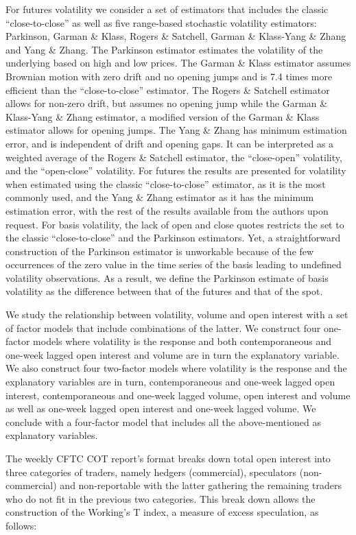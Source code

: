 \documentclass[12pt,]{article}
\begin{document}
For futures volatility we consider a set of estimators that includes the
classic ``close-to-close'' as well as five range-based stochastic
volatility estimators: Parkinson, Garman \& Klass, Rogers \& Satchell,
Garman \& Klass-Yang \& Zhang and Yang \& Zhang. The Parkinson estimator
estimates the volatility of the underlying based on high and low prices.
The Garman \& Klass estimator assumes Brownian motion with zero drift
and no opening jumps and is 7.4 times more efficient than the
``close-to-close'' estimator. The Rogers \& Satchell estimator allows
for non-zero drift, but assumes no opening jump while the Garman \&
Klass-Yang \& Zhang estimator, a modified version of the Garman \& Klass
estimator allows for opening jumps. The Yang \& Zhang has minimum
estimation error, and is independent of drift and opening gaps. It can
be interpreted as a weighted average of the Rogers \& Satchell
estimator, the ``close-open'' volatility, and the ``open-close''
volatility. For futures the results are presented for volatility when
estimated using the classic ``close-to-close'' estimator, as it is the
most commonly used, and the Yang \& Zhang estimator as it has the
minimum estimation error, with the rest of the results available from
the authors upon request. For basis volatility, the lack of open and
close quotes restricts the set to the classic ``close-to-close'' and the
Parkinson estimators. Yet, a straightforward construction of the
Parkinson estimator is unworkable because of the few occurrences of the
zero value in the time series of the basis leading to undefined
volatility observations. As a result, we define the Parkinson estimate
of basis volatility as the difference between that of the futures and
that of the spot.

We study the relationship between volatility, volume and open interest
with a set of factor models that include combinations of the latter. We
construct four one-factor models where volatility is the response and
both contemporaneous and one-week lagged open interest and volume are in
turn the explanatory variable. We also construct four two-factor models
where volatility is the response and the explanatory variables are in
turn, contemporaneous and one-week lagged open interest, contemporaneous
and one-week lagged volume, open interest and volume as well as one-week
lagged open interest and one-week lagged volume. We conclude with a
four-factor model that includes all the above-mentioned as explanatory
variables.

The weekly CFTC COT report's format breaks down total open interest into
three categories of traders, namely hedgers (commercial), speculators
(non-commercial) and non-reportable with the latter gathering the
remaining traders who do not fit in the previous two categories. This
break down allows the construction of the Working's T index, a measure
of excess speculation, as follows:
\end{document}
